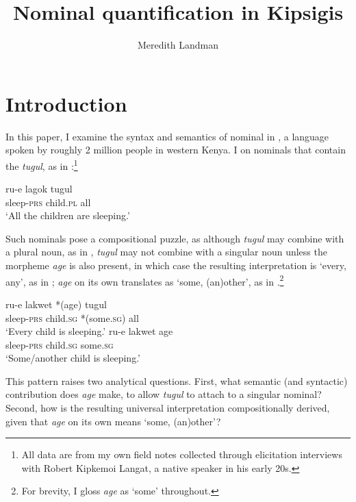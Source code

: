 \documentclass[output=paper,newtxmath,modfonts,nonflat,hidelinks]{langsci/langscibook}
\author{Meredith Landman \affiliation{Pomona College}}
\title{Nominal quantification in Kipsigis}
\begin{document}
\maketitle

\section{Introduction}\label{sec:landman:introduction}

In this paper, I examine the syntax and semantics of nominal  in , a  language spoken by roughly 2 million people in western Kenya. I  on nominals that contain the  \textit{tugul}, as in :\footnote{All data are from my own field notes collected through elicitation interviews with Robert Kipkemoi Langat, a native  speaker in his early 20s.}

\ea \label{ex:landman:1}
	\gll ru-e lagok tugul\\
       	 sleep-\textsc{prs} child.\textsc{pl} all\\
  \glt ‘All the children are sleeping.’
\z

\noindent Such nominals pose a compositional puzzle, as although \textit{tugul} may combine with a plural noun, as in , \textit{tugul} may not combine with a singular noun unless the morpheme \textit{age} is also present, in which case the resulting interpretation is ‘every, any’, as in ; \textit{age} on its own translates as ‘some, (an)other’, as in .\footnote{For brevity, I gloss \textit{age} as ‘some’ throughout.}

\ea
  \ea \label{ex:landman:2a}
    \gll ru-e lakwet *(age) tugul\\
       sleep-\textsc{prs} child.\textsc{sg} *(some.\textsc{sg}) all\\
    \glt ‘Every child is sleeping.’
  \ex \label{ex:landman:2b}
    \gll ru-e lakwet age\\
       	 sleep-\textsc{prs} child.\textsc{sg} some.\textsc{sg}\\
    \glt ‘Some/another child is sleeping.’
  \z
\z

\noindent This pattern raises two analytical questions. First, what semantic (and syntactic) contribution does \textit{age} make, to allow \textit{tugul} to attach to a singular nominal? Second, how is the resulting universal interpretation compositionally derived, given that \textit{age} on its own means ‘some, (an)other’?
\end{document}
